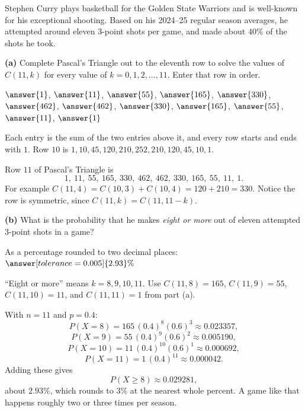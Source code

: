 \documentclass[12pt]{ximera}
\begin{document}
\begin{problem}
Stephen Curry plays basketball for the Golden State Warriors and is well-known for
his exceptional shooting. Based on his 2024--25 regular season averages, he attempted
around eleven 3-point shots per game, and made about $40\%$ of the shots he took.

\begin{prompt}
\textbf{(a)} Complete Pascal's Triangle out to the eleventh row to solve the values
of $C(11,k)$ for every value of $k=0,1,2,\ldots,11$. Enter that row in order.

$\answer{1}$, $\answer{11}$, $\answer{55}$, $\answer{165}$, $\answer{330}$,
$\answer{462}$, $\answer{462}$, $\answer{330}$, $\answer{165}$, $\answer{55}$,
$\answer{11}$, $\answer{1}$

\begin{hint}
Each entry is the sum of the two entries above it, and every row starts and ends with
$1$. Row $10$ is $1, 10, 45, 120, 210, 252, 210, 120, 45, 10, 1$.
\end{hint}

\begin{feedback}
Row $11$ of Pascal's Triangle is
\[
1,\ 11,\ 55,\ 165,\ 330,\ 462,\ 462,\ 330,\ 165,\ 55,\ 11,\ 1.
\]
For example $C(11,4)=C(10,3)+C(10,4)=120+210=330$. Notice the row is symmetric,
since $C(11,k)=C(11,11-k)$.
\end{feedback}
\end{prompt}


\begin{prompt}
\textbf{(b)} What is the probability that he makes \emph{eight or more} out of eleven
attempted 3-point shots in a game?

As a percentage rounded to two decimal places: $\answer[tolerance=0.005]{2.93}\%$

\begin{hint}
``Eight or more'' means $k=8,9,10,11$. Use $C(11,8)=165$, $C(11,9)=55$,
$C(11,10)=11$, and $C(11,11)=1$ from part (a).
\end{hint}

\begin{feedback}
With $n=11$ and $p=0.4$:
\[
P(X=8)=165\,(0.4)^8(0.6)^3 \approx 0.023357,
\]
\[
P(X=9)=55\,(0.4)^9(0.6)^2 \approx 0.005190,
\]
\[
P(X=10)=11\,(0.4)^{10}(0.6)^1 \approx 0.000692,
\]
\[
P(X=11)=1\,(0.4)^{11} \approx 0.000042.
\]
Adding these gives
\[
P(X\ge 8)\approx 0.029281,
\]
about $2.93\%$, which rounds to $3\%$ at the nearest whole percent. A game like that
happens roughly two or three times per season.
\end{feedback}
\end{prompt}
\end{problem}
\end{document}
